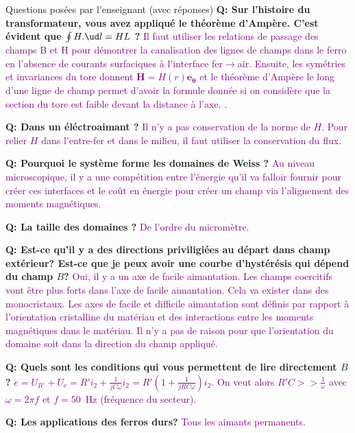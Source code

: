 \begin{reportBlock}{Questions posées par l’enseignant (avec réponses)}
   \textbf{Q: Sur l'histoire du transformateur, vous avez appliqué le théorème d'Ampère. C'est évident que $\oint H.\ud l = H L$ ? } \textcolor{purple}{Il faut utiliser les relations de passage des champs B et H pour démontrer la canalisation des lignes de champs dans le ferro en l'absence de courants surfaciques à l'interface fer$\rightarrow$air. Ensuite, les symétries et invariances du tore donnent $\mathbf{H}=H(r)\mathbf{e_{\theta}}$ et le théorème d'Ampère le long d'une ligne de champ permet d'avoir la formule donnée si on considère que la section du tore est faible devant la distance à l'axe.%
   .} \newline
  
  \textbf{Q: Dans un éléctroaimant ?} \textcolor{purple}{Il n'y a pas conservation de la norme de $H$. Pour relier $H$ dans l'entre-fer et dans le milieu, il faut utiliser la conservation du flux.} \newline
  
   \textbf{Q: Pourquoi le système forme les domaines de Weiss ?} \textcolor{purple}{Au niveau microscopique, il y a une compétition entre l'énergie qu'il va falloir fournir pour créer ces interfaces et le coût en énergie pour créer un champ via l'alignement des moments magnétiques.} \newline
  
  \textbf{Q: La taille des domaines ?} \textcolor{purple}{De l'ordre du micromètre.} \newline
  
   \textbf{Q: Est-ce qu'il y a des directions priviligiées au départ dans champ extérieur? Est-ce que je peux avoir une courbe d'hystérésis qui dépend du champ $B$?} \textcolor{purple}{Oui, il y a un axe de facile aimantation. Les champs coercitifs vont être plus forts dans l'axe de facile aimantation. Cela va exister dans des monocristaux. Les axes de facile et difficile aimantation sont définis par rapport à l'orientation cristalline du matériau et des interactions entre les moments magnétiques dans le matériau. Il n'y a pas de raison pour que l'orientation du domaine soit dans la direction du champ appliqué.} \newline
  
  \textbf{Q:  Quels sont les conditions qui vous permettent de lire directement $B$?} \textcolor{purple}{$e = U_{R'} + U_c = R' i_2 + \frac{1}{jC\omega} i_2 = R'(1+\frac{1}{jRC\omega}) i_2$. On veut alors $R'C >> \frac{1}{\omega}$ avec $\omega=2\pi f$ et $f=50$~Hz (fréquence du secteur).} \newline
  
  \textbf{Q: Les applications des ferros durs?} \textcolor{purple}{Tous les aimants permanents. } 
  
 
  
  \end{reportBlock}
  
